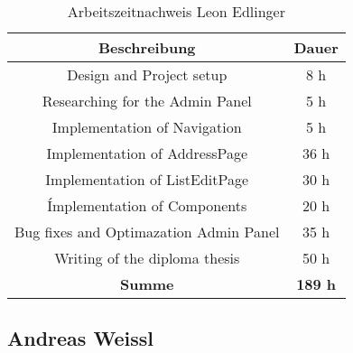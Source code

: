 \begin{table}[H]
  \centering
\begin{tabular}{|c|c|}
\hline
\multicolumn{1}{|c|}{\textbf{Beschreibung}}  &
\multicolumn{1}{c|}{\textbf{Dauer}}  \\ \hline
  Design and Project setup & 8 h \\ \hline
  Researching for the Admin Panel & 5 h \\ \hline
  Implementation of Navigation & 5 h \\ \hline
  Implementation of AddressPage & 36 h \\ \hline
  Implementation of ListEditPage & 30 h \\ \hline
  Ímplementation of Components & 20 h \\ \hline
  Bug fixes and Optimazation Admin Panel & 35 h \\ \hline
  Writing of the diploma thesis & 50 h \\ \hline
  {\textbf{Summe}} & \textbf{189 h} \\ \hline
 \end{tabular}
\caption{Arbeitszeitnachweis Leon Edlinger}
\end{table}

\newpage

\subsection{Andreas Weissl}

